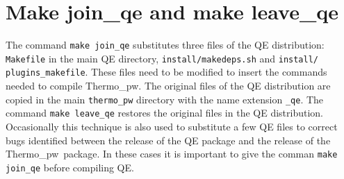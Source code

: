 \documentclass[12pt,a4paper,twoside]{report}
\def\tpw{{\sc Thermo}\_{\sc pw}}
\begin{document}
\newpage
{\color{dark-blue}\chapter{Make join\_qe and make leave\_qe}}
\color{black}

The command \texttt{make join\_qe} substitutes three files of the QE
distribution: \texttt{Makefile} in the main QE directory, 
\texttt{install/makedeps.sh} and \texttt{install/}
\texttt{plugins\_makefile}.
These files need to be modified to insert the commands needed to
compile \tpw. The original files of the QE distribution are copied
in the main \texttt{thermo\_pw} directory with the name extension
\texttt{\_qe}. The command \texttt{make leave\_qe} restores the original
files in the QE distribution.
Occasionally this technique is also used to substitute a few QE files
to correct bugs identified between the release of the QE package 
and the release of the \tpw\ package. In these cases it is important
to give the comman \texttt{make join\_qe} before compiling QE.
\end{document}
